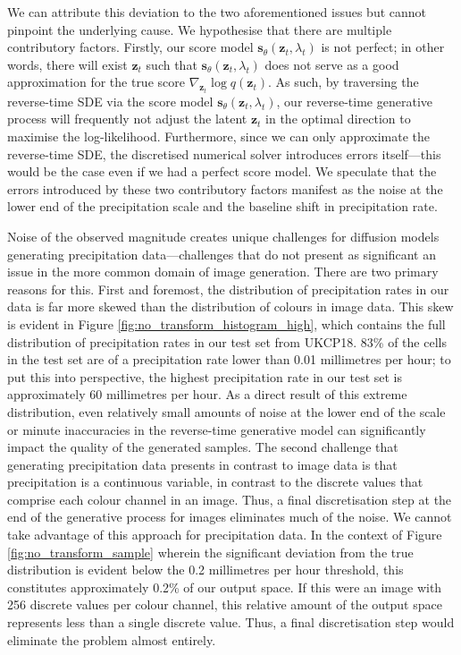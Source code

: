 \documentclass[ oneside,%
                    author={George Herbert},
                    degree={MSci},
                     title={Diffusion Models for Time-Evolving Precipitation Fields},
                  subtitle={}]{dissertation}
\begin{document}
We can attribute this deviation to the two aforementioned issues but cannot pinpoint the underlying cause. We hypothesise that there are multiple contributory factors. Firstly, our score model $\mathbf{s}_\theta(\mathbf{z}_t, \lambda_t)$ is not perfect; in other words, there will exist $\mathbf{z}_t$ such that $\mathbf{s}_\theta(\mathbf{z}_t, \lambda_t)$ does not serve as a good approximation for the true score $\nabla_{\mathbf{z}_t}  \log q(\mathbf{z}_t)$. As such, by traversing the reverse-time SDE via the score model $\mathbf{s}_\theta(\mathbf{z}_t,\lambda_t)$, our reverse-time generative process will frequently not adjust the latent $\mathbf{z}_t$ in the optimal direction to maximise the log-likelihood. Furthermore, since we can only approximate the reverse-time SDE, the discretised numerical solver introduces errors itself---this would be the case even if we had a perfect score model. We speculate that the errors introduced by these two contributory factors manifest as the noise at the lower end of the precipitation scale and the baseline shift in precipitation rate.

Noise of the observed magnitude creates unique challenges for diffusion models generating precipitation data---challenges that do not present as significant an issue in the more common domain of image generation. There are two primary reasons for this. First and foremost, the distribution of precipitation rates in our data is far more skewed than the distribution of colours in image data. This skew is evident in Figure \ref{fig:no_transform_histogram_high}, which contains the full distribution of precipitation rates in our test set from UKCP18. 83\% of the cells in the test set are of a precipitation rate lower than 0.01 millimetres per hour; to put this into perspective, the highest precipitation rate in our test set is approximately 60 millimetres per hour. As a direct result of this extreme distribution, even relatively small amounts of noise at the lower end of the scale or minute inaccuracies in the reverse-time generative model can significantly impact the quality of the generated samples. The second challenge that generating precipitation data presents in contrast to image data is that precipitation is a continuous variable, in contrast to the discrete values that comprise each colour channel in an image. Thus, a final discretisation step at the end of the generative process for images eliminates much of the noise. We cannot take advantage of this approach for precipitation data. In the context of Figure \ref{fig:no_transform_sample} wherein the significant deviation from the true distribution is evident below the 0.2 millimetres per hour threshold, this constitutes approximately 0.2\% of our output space. If this were an image with 256 discrete values per colour channel, this relative amount of the output space represents less than a single discrete value. Thus, a final discretisation step would eliminate the problem almost entirely.
\end{document}
